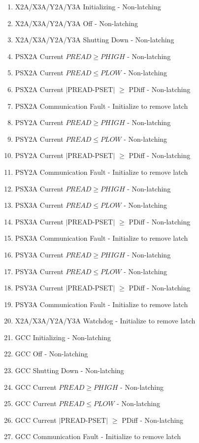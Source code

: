\documentclass[11pt]{book}		%
\begin{document}
\begin{enumerate}
 \item X2A/X3A/Y2A/Y3A Initializing - Non-latching
 \item X2A/X3A/Y2A/Y3A Off - Non-latching
 \item X2A/X3A/Y2A/Y3A Shutting Down - Non-latching
 \item PSX2A Current $PREAD \geq PHIGH$ - Non-latching
 \item PSX2A Current $PREAD \leq PLOW$ - Non-latching
 \item PSX2A Current $\mid$PREAD-PSET$\mid$  $\geq$ PDiff - Non-latching
 \item PSX2A Communication Fault - Initialize to remove latch
 \item PSY2A Current $PREAD \geq PHIGH$ - Non-latching
 \item PSY2A Current $PREAD \leq PLOW$ - Non-latching
 \item PSY2A Current $\mid$PREAD-PSET$\mid$  $\geq$ PDiff - Non-latching
 \item PSY2A Communication Fault - Initialize to remove latch
 \item PSX3A Current $PREAD \geq PHIGH$ - Non-latching
 \item PSX3A Current $PREAD \leq PLOW$ - Non-latching
 \item PSX3A Current $\mid$PREAD-PSET$\mid$  $\geq$ PDiff - Non-latching
 \item PSX3A Communication Fault - Initialize to remove latch
 \item PSY3A Current $PREAD \geq PHIGH$ - Non-latching
 \item PSY3A Current $PREAD \leq PLOW$ - Non-latching
 \item PSY3A Current $\mid$PREAD-PSET$\mid$  $\geq$ PDiff - Non-latching
 \item PSY3A Communication Fault - Initialize to remove latch
 \item X2A/X3A/Y2A/Y3A Watchdog - Initialize to remove latch
 \item GCC Initializing - Non-latching
 \item GCC Off - Non-latching
 \item GCC Shutting Down - Non-latching
 \item GCC Current $PREAD \geq PHIGH$ - Non-latching
 \item GCC Current $PREAD \leq PLOW$ - Non-latching
 \item GCC Current $\mid$PREAD-PSET$\mid$  $\geq$ PDiff - Non-latching
 \item GCC Communication Fault - Initialize to remove latch

\end{enumerate}
\end{document}
